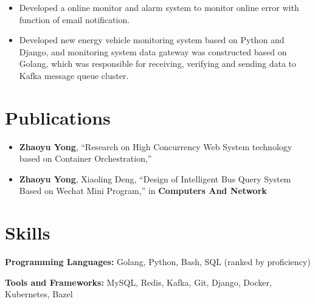 \documentclass{resume}
\begin{document}
\begin{itemize}
    \item Developed a online monitor and alarm system to monitor online error with function of email notification.
\end{itemize}

\begin{itemize}
    \item Developed new energy vehicle monitoring system based on Python and Django, and monitoring system data gateway was constructed based on Golang, which was responsible for receiving, verifying and sending data to Kafka message queue cluster.
\end{itemize}

\section{Publications}
\begin{itemize}
    \item \textbf{Zhaoyu Yong}, ``Research on High Concurrency Web System technology based on Container Orchestration,''
    \item \textbf{Zhaoyu Yong}, Xiaoling Deng,  ``Design of Intelligent Bus Query System Based on Wechat Mini Program,'' in \textbf{Computers And Network}
\end{itemize}

\section{Skills}
\textbf{Programming Languages:} \small Golang, Python, Bash, SQL (ranked by proficiency)

\textbf{Tools and Frameworks:} \small MySQL, Redis, Kafka, Git, Django, Docker, Kubernetes, Bazel
\end{document}
